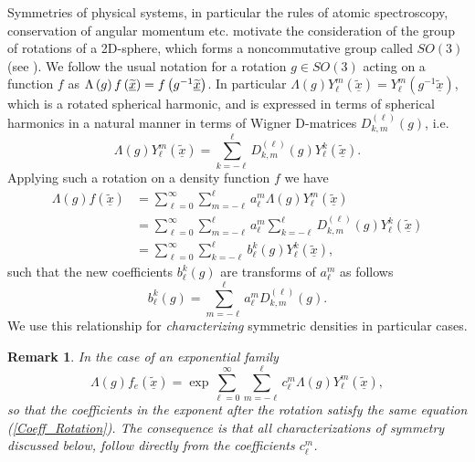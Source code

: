 \documentclass[preprint,11pt,a4paper]{elsarticle}
\newtheorem{remark}[theorem]{Remark}
\begin{document}
Symmetries of physical systems, in particular the rules of atomic
spectroscopy, conservation of angular momentum etc. motivate the
consideration of the group of rotations of a 2D-sphere, which forms a
noncommutative group called $SO\left( 3\right) $ (see \cite{wigner2012group}%
). We follow the usual notation for a rotation $g\in SO\left( 3\right) $
acting on a function $f$ as $\Lambda\left( g\right) f\left( \underline{%
\widetilde{x}}\right) =f\left( g^{-1}\underline{\widetilde{x}}\right) $. In
particular $\Lambda\left( g\right) Y_{\ell}^{m}\left( \underline{\widetilde{x%
}}\right) =Y_{\ell}^{m}\left( g^{-1}\underline{\widetilde{x}}\right) $,
which is a rotated spherical harmonic, and is expressed in terms of
spherical harmonics in a natural manner in terms of Wigner D-matrices $%
D_{k,m}^{\left( \ell\right) }\left( g\right) $, i.e. 
\begin{equation}
\Lambda\left( g\right) Y_{\ell}^{m}\left( \underline{\widetilde{x}}\right)
=\sum_{k=-\ell}^{\ell}D_{k,m}^{\left( \ell\right) }\left( g\right)
Y_{\ell}^{k}\left( \underline{\widetilde{x}}\right) .  \label{MatrixWignerD}
\end{equation}
Applying such a rotation on a density function $f$ we have%
\begin{align*}
\Lambda\left( g\right) f\left( \underline{\widetilde{x}}\right) &
=\sum_{\ell=0}^{\infty}\sum_{m=-\ell}^{\ell}a_{\ell}^{m}\Lambda\left(
g\right) Y_{\ell}^{m}\left( \underline{\widetilde{x}}\right) \\
& =\sum_{\ell=0}^{\infty}\sum_{m=-\ell}^{\ell}a_{\ell}^{m}\sum_{k=-\ell
}^{\ell}D_{k,m}^{\left( \ell\right) }\left( g\right) Y_{\ell}^{k}\left( 
\underline{\widetilde{x}}\right) \\
& =\sum_{\ell=0}^{\infty}\sum_{k=-\ell}^{\ell}b_{\ell}^{k}\left( g\right)
Y_{\ell}^{k}\left( \underline{\widetilde{x}}\right) ,
\end{align*}
such that the new coefficients $b_{\ell}^{k}\left( g\right) $ are transforms
of $a_{\ell}^{m}$ as follows 
\begin{equation}
b_{\ell}^{k}\left( g\right)
=\sum_{m=-\ell}^{\ell}a_{\ell}^{m}D_{k,m}^{\left( \ell\right) }\left(
g\right) .  \label{Coeff_Rotation}
\end{equation}
We use this relationship for \textit{characterizing} symmetric densities in
particular cases.

\begin{remark}
In the case of an exponential family%
\begin{equation*}
\Lambda\left( g\right) f_{e}\left( \underline{\widetilde{x}}\right)
=\exp\sum_{\ell=0}^{\infty}\sum_{m=-\ell}^{\ell}c_{\ell}^{m}\Lambda\left(
g\right) Y_{\ell}^{m}\left( \underline{\widetilde{x}}\right) ,
\end{equation*}
so that the coefficients in the exponent after the rotation satisfy the same
equation (\ref{Coeff_Rotation}). The consequence is that all
characterizations of symmetry discussed below, follow directly from the
coefficients $c_{\ell }^{m}$.
\end{remark}
\end{document}
